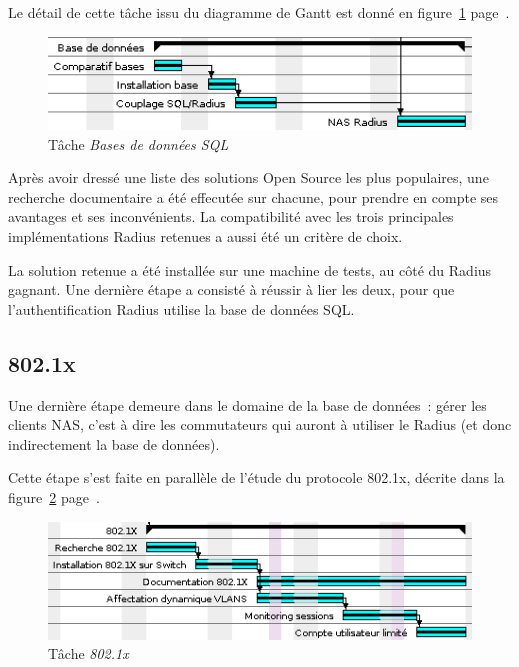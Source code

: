 Le détail de cette tâche issu du diagramme de Gantt est donné en figure~\ref{gantt_sql} page~\pageref{gantt_sql}.

\begin{figure}[!h]
	\begin{center}
		\includegraphics[width=350pt]{img/gantt_sql.png}
	\end{center}
	\caption{Tâche \textit{Bases de données SQL}}
	\label{gantt_sql}
\end{figure}

Après avoir dressé une liste des solutions Open Source les plus populaires, une recherche documentaire a été effecutée sur chacune, pour prendre en compte ses avantages et ses inconvénients. La compatibilité avec les trois principales implémentations Radius retenues a aussi été un critère de choix.

La solution retenue a été installée sur une machine de tests, au côté du Radius gagnant. Une dernière étape a consisté à réussir à lier les deux, pour que l'authentification Radius utilise la base de données SQL.

\subsection{802.1x}

Une dernière étape demeure dans le domaine de la base de données~: gérer les clients NAS, c'est à dire les commutateurs qui auront à utiliser le Radius (et donc indirectement la base de données).

Cette étape s'est faite en parallèle de l'étude du protocole 802.1x, décrite dans la figure~\ref{gantt_dot1x} page~\pageref{gantt_dot1x}.

\begin{figure}[!h]
	\begin{center}
		\includegraphics[width=350pt]{img/gantt_dot1x.png}
	\end{center}
	\caption{Tâche \textit{802.1x}}
	\label{gantt_dot1x}
\end{figure}

